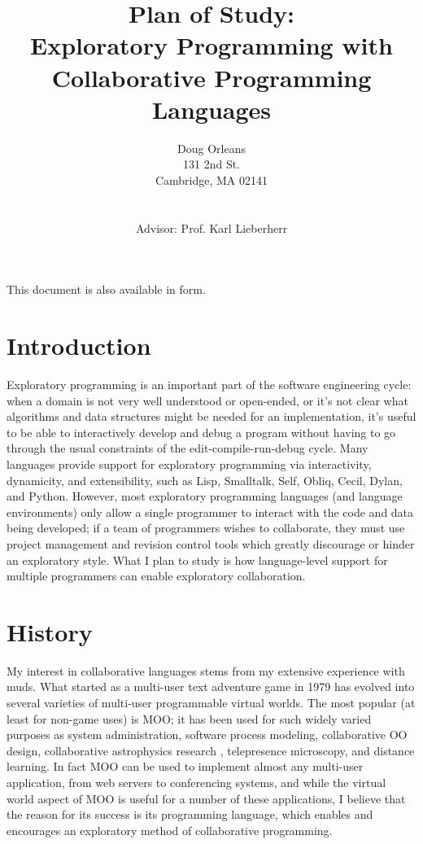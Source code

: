 \documentclass{article}
\title{Plan of Study: \\ Exploratory Programming with Collaborative
	Programming Languages}
\author{Doug Orleans \\ 131 2nd St. \\ Cambridge, MA 02141 \\
	\email{dougo@ccs.neu.edu} \\
	\\ Advisor: Prof. Karl Lieberherr \\ \email{lieber@ccs.neu.edu}}
\begin{document}
\begin{htmlonly}
This document is also available in
 form.
\end{htmlonly}

\maketitle

\section{Introduction}

Exploratory programming is an important part of the software
engineering cycle: when a domain is not very well understood or
open-ended, or it's not clear what algorithms and data structures
might be needed for an implementation, it's useful to be able to
interactively develop and debug a program without having to go through
the usual constraints of the edit-compile-run-debug cycle.  Many
languages provide support for exploratory programming via
interactivity, dynamicity, and extensibility, such as Lisp, Smalltalk,
Self, Obliq, Cecil, Dylan, and Python.  However, most exploratory
programming languages (and language environments) only allow a single
programmer to interact with the code and data being developed; if a
team of programmers wishes to collaborate, they must use project
management and revision control tools which greatly discourage or
hinder an exploratory style.  What I plan to study is how
language-level support for multiple programmers can enable exploratory
collaboration.

\section{History}

My interest in collaborative languages stems from my extensive
experience with muds.  What started as a multi-user text adventure
game in 1979 has evolved into several varieties of multi-user
programmable virtual worlds.  The most popular (at least for non-game
uses) is MOO; it has been used for such widely varied purposes as
system administration\cite{remy}, software process
modeling\cite{ACM-MOO}, collaborative OO design\cite{CRC-MOO},
collaborative astrophysics research \cite{AstroVR}, telepresence
microscopy\cite{LabSpace}, and distance
learning\cite{distance-learning}.  In fact MOO can be used to
implement almost any multi-user application, from web servers to
conferencing systems, and while the virtual world aspect of MOO is
useful for a number of these applications, I believe that the reason
for its success is its programming language, which enables and
encourages an exploratory method of collaborative programming.
\end{document}
